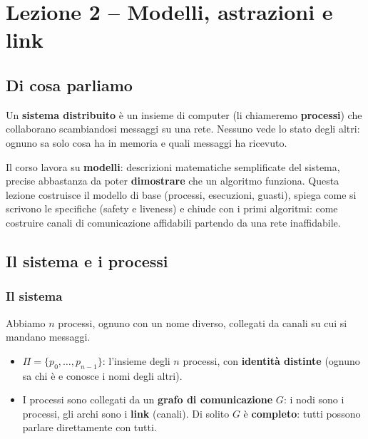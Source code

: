 \chapter{Lezione 2 -- Modelli, astrazioni e link}

\section{Di cosa parliamo}

Un \textbf{sistema distribuito} è un insieme di computer (li chiameremo \textbf{processi}) che collaborano scambiandosi messaggi su una rete. Nessuno vede lo stato degli altri: ognuno sa solo cosa ha in memoria e quali messaggi ha ricevuto.

Il corso lavora su \textbf{modelli}: descrizioni matematiche semplificate del sistema, precise abbastanza da poter \textbf{dimostrare} che un algoritmo funziona. Questa lezione costruisce il modello di base (processi, esecuzioni, guasti), spiega come si scrivono le specifiche (safety e liveness) e chiude con i primi algoritmi: come costruire canali di comunicazione affidabili partendo da una rete inaffidabile.

\section{Il sistema e i processi}

\subsection{Il sistema}

\begin{inbreve}

Abbiamo \(n\) processi, ognuno con un nome diverso, collegati da canali su cui si mandano messaggi.

\end{inbreve}

\begin{itemize}
\tightlist
\item
  \(\Pi = \{p_0, \dots, p_{n-1}\}\): l'insieme degli \(n\) processi, con \textbf{identità distinte} (ognuno sa chi è e conosce i nomi degli altri).
\item
  I processi sono collegati da un \textbf{grafo di comunicazione} \(G\): i nodi sono i processi, gli archi sono i \textbf{link} (canali). Di solito \(G\) è \textbf{completo}: tutti possono parlare direttamente con tutti.
\end{itemize}

